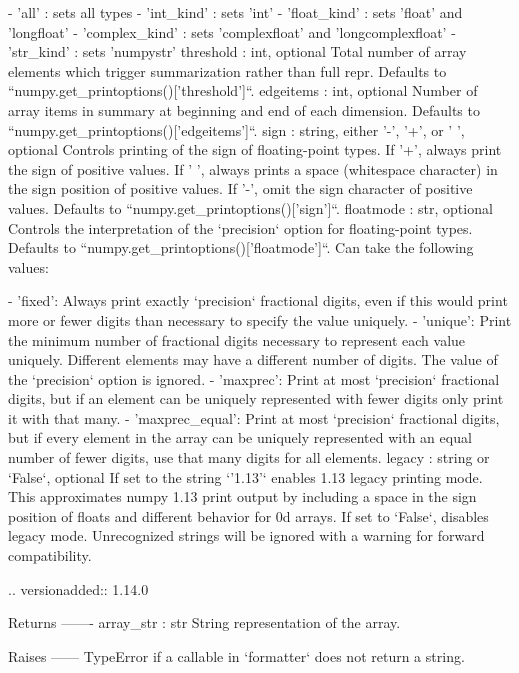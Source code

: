 \begin{DoxyVerb}
    - 'all' : sets all types
    - 'int_kind' : sets 'int'
    - 'float_kind' : sets 'float' and 'longfloat'
    - 'complex_kind' : sets 'complexfloat' and 'longcomplexfloat'
    - 'str_kind' : sets 'numpystr'
threshold : int, optional
    Total number of array elements which trigger summarization
    rather than full repr.
    Defaults to ``numpy.get_printoptions()['threshold']``.
edgeitems : int, optional
    Number of array items in summary at beginning and end of
    each dimension.
    Defaults to ``numpy.get_printoptions()['edgeitems']``.
sign : string, either '-', '+', or ' ', optional
    Controls printing of the sign of floating-point types. If '+', always
    print the sign of positive values. If ' ', always prints a space
    (whitespace character) in the sign position of positive values.  If
    '-', omit the sign character of positive values.
    Defaults to ``numpy.get_printoptions()['sign']``.
floatmode : str, optional
    Controls the interpretation of the `precision` option for
    floating-point types.
    Defaults to ``numpy.get_printoptions()['floatmode']``.
    Can take the following values:

    - 'fixed': Always print exactly `precision` fractional digits,
      even if this would print more or fewer digits than
      necessary to specify the value uniquely.
    - 'unique': Print the minimum number of fractional digits necessary
      to represent each value uniquely. Different elements may
      have a different number of digits.  The value of the
      `precision` option is ignored.
    - 'maxprec': Print at most `precision` fractional digits, but if
      an element can be uniquely represented with fewer digits
      only print it with that many.
    - 'maxprec_equal': Print at most `precision` fractional digits,
      but if every element in the array can be uniquely
      represented with an equal number of fewer digits, use that
      many digits for all elements.
legacy : string or `False`, optional
    If set to the string `'1.13'` enables 1.13 legacy printing mode. This
    approximates numpy 1.13 print output by including a space in the sign
    position of floats and different behavior for 0d arrays. If set to
    `False`, disables legacy mode. Unrecognized strings will be ignored
    with a warning for forward compatibility.

    .. versionadded:: 1.14.0

Returns
-------
array_str : str
    String representation of the array.

Raises
------
TypeError
    if a callable in `formatter` does not return a string.


\end{DoxyVerb}
